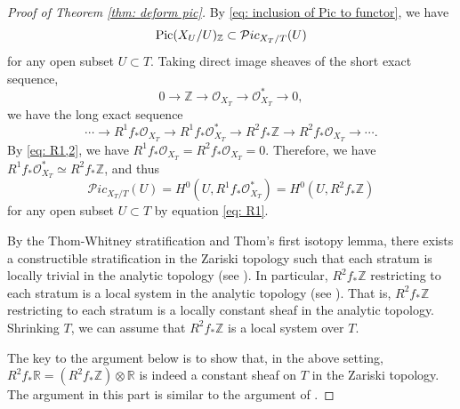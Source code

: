 \documentclass[11pt,oneside,reqno]{amsart}
\numberwithin{equation}{section}
\theoremstyle{definition}
\newcommand{\Pic}{{\rm {Pic}}}
\newcommand{\bR}{\mathbb{R}}
\newcommand{\bZ}{\mathbb{Z}}
\newcommand{\mO}{\mathcal{O}}
\newcommand{\mP}{\mathcal{P}}
\begin{document}
\begin{proof}[Proof of Theorem \ref{thm: deform pic}]
By \eqref{eq: inclusion of Pic to functor}, we have
\[
\Pic(X_U/U)_{\bZ} \subset {\mP}ic_{X_T/T}(U)
\] for any open subset $U\subset T$.
Taking direct image sheaves of the short exact sequence, 
\[
0 \to \bZ \to \mO_{X_T} \to \mO^*_{X_T} \to 0,
\] we have the long exact sequence
\[
\cdots \to R^1f_* \mO_{X_T} \to R^1f_*\mO^*_{X_T} \to R^2f_*\bZ \to R^2f_* \mO_{X_T} \to \cdots.
\] By \eqref{eq: R1,2}, we have $R^1f_* \mO_{X_T}= R^2f_* \mO_{X_T}=0$. Therefore, we have $R^1f_*\mO^*_{X_T} \simeq R^2f_*\bZ$, and thus
\begin{equation}\label{eq: Pic =H^0}
{\mP}ic_{X_T/T}(U) = H^0(U, R^1f_*\mO^*_{X_T}) = H^0(U, R^2f_*\bZ)
\end{equation} for any open subset $U\subset T$ by equation \eqref{eq: R1}.


By the Thom-Whitney stratification and Thom’s first isotopy lemma, there exists a constructible stratification in the Zariski topology such that each stratum is locally trivial in the analytic topology (see \cite[Theorem 3.2]{ZS10}). In particular, $R^2f_*\bZ$ restricting to each stratum is a local system in the analytic topology (see \cite[Proposition 3.5]{ZS10}). That is, $R^2f_*\bZ$ restricting to each stratum is a locally constant sheaf in the analytic topology. Shrinking $T$, we can assume that 
$R^2f_*\bZ$ is a local system over $T$.

The key to the argument below is to show that, in the above setting, $R^2f_*\bR = (R^2f_*\bZ) \otimes \bR$ is indeed a constant sheaf on $T$ in the Zariski topology. The argument in this part is similar to the argument of \cite[Lemma 6.6]{dFH11}.


\end{proof}
\end{document}
